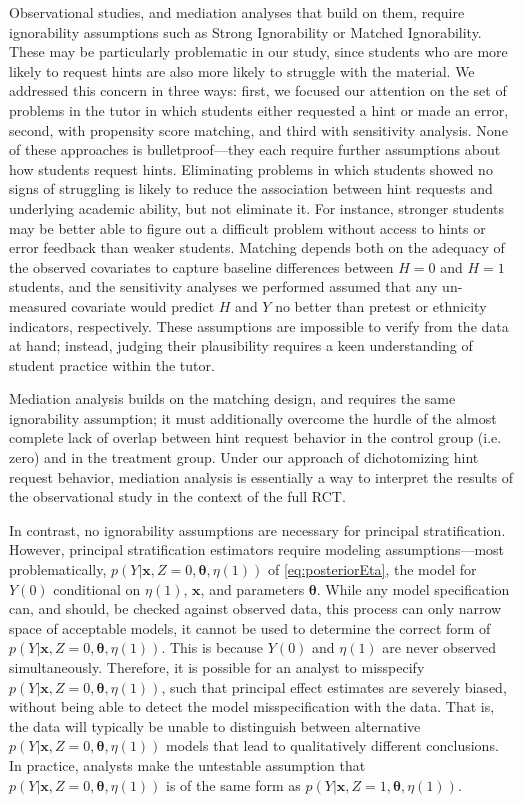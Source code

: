 \documentclass{article}\usepackage[]{graphicx}\usepackage[]{color}
\begin{document}
Observational studies, and mediation analyses that build on them,
require ignorability assumptions such as Strong Ignorability or
Matched Ignorability.
These may be particularly problematic in our study, since students who
are more likely to request hints are also more likely to struggle with
the material.
We addressed this concern in three ways: first, we focused our attention
on the set of problems in the tutor in which students either requested
a hint or made an error, second, with propensity score matching, and
third with sensitivity analysis.
None of these approaches is bulletproof---they each require further
assumptions about how students request hints.
Eliminating problems in which students showed no signs of struggling
is likely to reduce the association between hint requests and
underlying academic ability, but not eliminate it.
For instance, stronger students may be better able to figure out a
difficult problem without access to hints or error feedback than
weaker students.
Matching depends both on the adequacy of the observed covariates to
capture baseline differences between $H=0$ and $H=1$ students, and the
sensitivity analyses we performed assumed that any un-measured
covariate would predict $H$ and $Y$ no better than pretest or ethnicity indicators, respectively.
These assumptions are impossible to verify from the data at hand;
instead, judging their plausibility requires a keen understanding of student practice within
the tutor.

Mediation analysis builds on the matching design, and requires the same
ignorability assumption; it must
additionally overcome the hurdle of the almost complete lack of
overlap between hint request behavior in the control group (i.e. zero)
and in the treatment group.
Under our approach of dichotomizing hint request behavior, mediation
analysis is essentially a way to interpret the results of the
observational study in the context of the full RCT.

In contrast, no ignorability assumptions are necessary for principal
stratification.
However, principal stratification estimators require modeling
assumptions---most problematically, $p(Y|\bm{x},Z=0,\bm{\theta},\eta(1))$ of
\eqref{eq:posteriorEta}, the model for $Y(0)$
conditional on $\eta(1)$, $\bm{x}$, and parameters $\bm{\theta}$.
While any model specification can, and should, be checked against
observed data, this process can only narrow space of acceptable
models, it cannot be used to determine the correct form of
$p(Y|\bm{x},Z=0,\bm{\theta},\eta(1))$.
This is because $Y(0)$ and $\eta(1)$ are never observed simultaneously.
Therefore, it is possible for an analyst to misspecify $p(Y|\bm{x},Z=0,\bm{\theta},\eta(1))$, such that principal effect estimates are
severely biased, without being able to detect the model
misspecification with the data.
That is, the data will typically be unable to distinguish between
alternative $p(Y|\bm{x},Z=0,\bm{\theta},\eta(1))$ models that lead to
qualitatively different conclusions.
In practice, analysts make the untestable assumption that $p(Y|\bm{x},Z=0,\bm{\theta},\eta(1))$ is
of the same form as $p(Y|\bm{x},Z=1,\bm{\theta},\eta(1))$.
\end{document}
